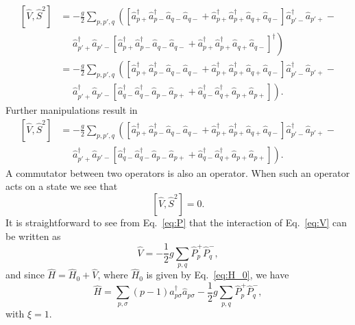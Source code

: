 \documentclass[a4paper,11pt,twoside]{article}
\begin{document}
\begin{align*}
\left[ \hat V, \hat S^2 \right]
%
&= -\frac{g}{2} \sum_{p,p',q} \left( \left[ \hat a_{p+}^\dagger \hat a_{p-}^\dagger \hat a_{q-} \hat a_{q-} + \hat a_{p+}^\dagger \hat a_{p+}^\dagger \hat a_{q+} \hat a_{q-} \right] \hat a_{p'-}^\dagger \hat a_{p'+} - \right. \\
%
&\quad\,\, \left.
\hat a_{p'+}^\dagger \hat a_{p'-} \left[ \hat a_{p+}^\dagger \hat a_{p-}^\dagger \hat a_{q-} \hat a_{q-} + \hat a_{p+}^\dagger \hat a_{p+}^\dagger \hat a_{q+} \hat a_{q-} \right]^\dagger \right) \\
%
&= -\frac{g}{2} \sum_{p,p',q} \left( \left[ \hat a_{p+}^\dagger \hat a_{p-}^\dagger \hat a_{q-} \hat a_{q-} + \hat a_{p+}^\dagger \hat a_{p+}^\dagger \hat a_{q+} \hat a_{q-} \right] \hat a_{p'-}^\dagger \hat a_{p'+} - \right. \\
%
&\quad\,\, \left.
\hat a_{p'+}^\dagger \hat a_{p'-} \left[ \hat a_{q-}^\dagger \hat a_{q-}^\dagger \hat a_{p-} \hat a_{p+} + \hat a_{q-}^\dagger \hat a_{q+}^\dagger \hat a_{p+} \hat a_{p+}  \right] \right) .
\end{align*}
%
Further manipulations result in
\begin{align*}
\left[ \hat V, \hat S^2 \right]
%
&= -\frac{g}{2} \sum_{p,p',q} \left( \left[ \hat a_{p+}^\dagger \hat a_{p-}^\dagger \hat a_{q-} \hat a_{q-} + \hat a_{p+}^\dagger \hat a_{p+}^\dagger \hat a_{q+} \hat a_{q-} \right] \hat a_{p'-}^\dagger \hat a_{p'+} - \right. \\
%
&\quad\,\, \left.
\hat a_{p'+}^\dagger \hat a_{p'-} \left[ \hat a_{q-}^\dagger \hat a_{q-}^\dagger \hat a_{p-} \hat a_{p+} + \hat a_{q-}^\dagger \hat a_{q+}^\dagger \hat a_{p+} \hat a_{p+}  \right] \right) .
\end{align*}
A commutator between two operators is also an operator. When such an operator acts on a state we see that 
\[ \left[ \hat V, \hat S^2 \right] = 0. \]
%
It is straightforward to see from Eq.~\eqref{eq:P} that the interaction of Eq.~\eqref{eq:V} can be written as
\[ \hat V = -\frac{1}{2} g \sum_{p,q} \hat P_p^+ \hat P_q^- , \]
and since $\hat H = \hat H_0 + \hat V$, where $\hat H_0$ is given by Eq.~\eqref{eq:H_0}, we have
\begin{equation}
\hat H = \sum_{p,\sigma} (p-1) \hat a_{p\sigma}^\dagger \hat a_{p\sigma} -\frac{1}{2} g \sum_{p,q} \hat P_p^+ \hat P_q^-,
\label{eq:H}
\end{equation}
%
with $\xi = 1$.

\end{document}
